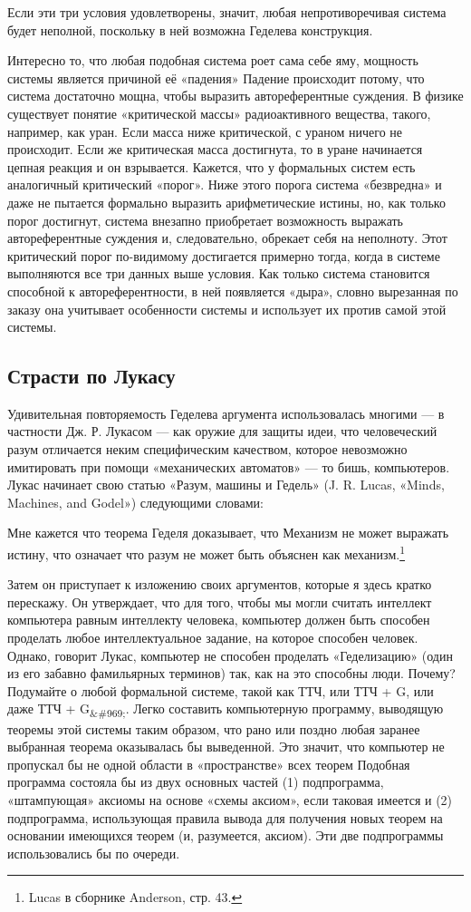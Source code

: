 \documentclass[../main.tex]{subfiles}
\begin{document}
Если эти три условия удовлетворены, значит, любая непротиворечивая система будет неполной, поскольку в ней возможна Геделева конструкция.

Интересно то, что любая подобная система роет сама себе яму, мощность системы является причиной её «падения» Падение происходит потому, что система достаточно мощна, чтобы выразить автореферентные суждения. В физике существует понятие «критической массы» радиоактивного вещества, такого, например, как уран. Если масса ниже критической, с ураном ничего не происходит. Если же критическая масса достигнута, то в уране начинается цепная реакция и он взрывается. Кажется, что у формальных систем есть аналогичный критический «порог». Ниже этого порога система «безвредна» и даже не пытается формально выразить арифметические истины, но, как только порог достигнут, система внезапно приобретает возможность выражать автореферентные суждения и, следовательно, обрекает себя на неполноту. Этот критический порог по-видимому достигается примерно тогда, когда в системе выполняются все три данных выше условия. Как только система становится способной к автореферентности, в ней появляется «дыра», словно вырезанная по заказу она учитывает особенности системы и использует их против самой этой системы.


\subsection{Страсти по Лукасу}

Удивительная повторяемость Геделева аргумента использовалась многими --- в частности Дж. Р. Лукасом --- как оружие для защиты идеи, что человеческий разум отличается неким специфическим качеством, которое невозможно имитировать при помощи «механических автоматов» --- то бишь, компьютеров. Лукас начинает свою статью «Разум, машины и Гедель» (J. R. Lucas, «Minds, Machines, and Godel») следующими словами:

Мне кажется что теорема Геделя доказывает, что Механизм не может выражать истину, что означает что разум не может быть объяснен как механизм.\footnote{Lucas в сборнике Anderson, стр. 43.}

Затем он приступает к изложению своих аргументов, которые я здесь кратко перескажу. Он утверждает, что для того, чтобы мы могли считать интеллект компьютера равным интеллекту человека, компьютер должен быть способен проделать любое интеллектуальное задание, на которое способен человек. Однако, говорит Лукас, компьютер не способен проделать «Геделизацию» (один из его забавно фамильярных терминов) так, как на это способны люди. Почему? Подумайте о любой формальной системе, такой как ТТЧ, или ТТЧ + G, или даже ТТЧ + G\textsubscript{\&\#969;}. Легко составить компьютерную программу, выводящую теоремы этой системы таким образом, что рано или поздно любая заранее выбранная теорема оказывалась бы выведенной. Это значит, что компьютер не пропускал бы не одной области в «пространстве» всех теорем Подобная программа состояла бы из двух основных частей (1) подпрограмма, «штампующая» аксиомы на основе «схемы аксиом», если таковая имеется и (2) подпрограмма, использующая правила вывода для получения новых теорем на основании имеющихся теорем (и, разумеется, аксиом). Эти две подпрограммы использовались бы по очереди.
\end{document}
